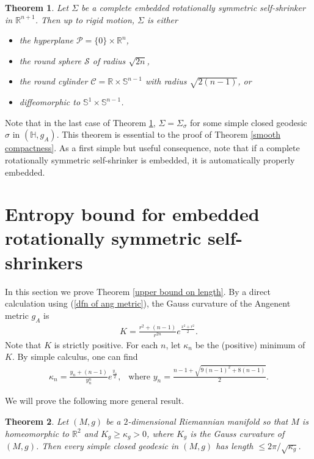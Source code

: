 \documentclass[12pt]{amsart}
\numberwithin{equation}{section}
\newtheorem{thm}{Theorem}[section]
\theoremstyle{remark}
\begin{document}
	\begin{thm}{\cite[Theorem 2]{KM}} \label{partial classification of KM}
		Let $\Sigma$ be a complete embedded rotationally symmetric self-shrinker in $\mathbb R^{n+1}$. Then up to rigid motion, $\Sigma$ is either 
		\begin{itemize}
			\item [(i)] the hyperplane $\mathcal P = \{0\}\times \mathbb R^n$,
			\item [(ii)] the round sphere $\mathcal S$ of radius $\sqrt {2n}$, 
			\item [(iii)] the round cylinder $\mathcal C =  \mathbb R \times \mathbb S^{n-1} $ with radius $\sqrt{2(n-1)}$, or
			\item [(iv)] diffeomorphic to $ \mathbb S^1\times \mathbb S^{n-1} $.  
		\end{itemize}
	\end{thm}
	Note that in the last case of Theorem \ref{partial classification of KM}, $\Sigma = \Sigma_\sigma$ for some simple closed geodesic $\sigma$ in $(\mathbb H, g_A)$. This theorem is essential to the proof of Theorem \ref{smooth compactness}. 
	As a first simple but useful consequence, note that if a complete rotationally symmetric self-shrinker is embedded, it is automatically properly embedded.
	
	\section{Entropy bound for embedded rotationally symmetric self-shrinkers} \label{upper bound section}
	In this section we prove Theorem \ref{upper bound on length}. By a direct calculation using (\ref{dfn of ang metric}), the Gauss curvature of the Angenent metric $g_A$ is 
	\begin{align*}
		K = \frac{r^2+ (n-1)}{r^{2n}} e^{\frac{x^2 + r^2}{2}}.
	\end{align*}
	Note that $K$ is strictly positive. For each $n$, let $\kappa_n$ be the (positive) minimum of $K$. By simple calculus, one can find
	\begin{align*} 
		\kappa_n = \frac{y_n+(n-1)}{y^n_n} e^\frac{y_n}{2} , \ \ \text{ where } y_n = \frac{n-1 + \sqrt{9(n-1)^2 + 8(n-1)}}{2}.
	\end{align*}
	
	We will prove the following more general result.
	\begin{thm} \label{upper bound on length of minimal geodesic in a ball}
		Let $(M, g)$ be a $2$-dimensional Riemannian manifold so that $M$ is homeomorphic to $\mathbb R^2$ and $K_g \ge \kappa_g >0$, where $K_g$ is the Gauss curvature of $(M, g)$. Then every simple closed geodesic in $(M, g)$ has length $\le 2\pi/\sqrt{\kappa_g}$. 
	\end{thm}
	
\end{document}

